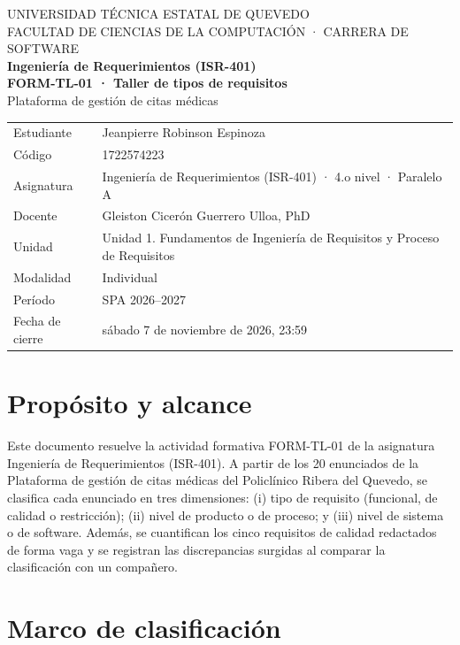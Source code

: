 \documentclass[11pt,a4paper]{article}
\newcommand{\codigoestudiante}{1722574223}
\newcommand{\nombreestudiante}{Jeanpierre Robinson Espinoza}
\begin{document}
\begin{center}
{\small UNIVERSIDAD TÉCNICA ESTATAL DE QUEVEDO}\\
{\small FACULTAD DE CIENCIAS DE LA COMPUTACIÓN · CARRERA DE SOFTWARE}\\[0.25cm]
{\large\bfseries Ingeniería de Requerimientos (ISR-401)}\\[0.15cm]
{\Large\bfseries FORM-TL-01 · Taller de tipos de requisitos}\\[0.1cm]
{\normalsize Plataforma de gestión de citas médicas}\\[0.35cm]
\end{center}

\begin{center}
\small
\begin{tabular}{@{}ll@{}}
\toprule
Estudiante & \nombreestudiante \\
Código & \codigoestudiante \\
Asignatura & Ingeniería de Requerimientos (ISR-401) · 4.o nivel · Paralelo A \\
Docente & Gleiston Cicerón Guerrero Ulloa, PhD \\
Unidad & Unidad 1. Fundamentos de Ingeniería de Requisitos y Proceso de Requisitos \\
Modalidad & Individual \\
Período & SPA 2026--2027 \\
Fecha de cierre & sábado 7 de noviembre de 2026, 23:59 \\
\bottomrule
\end{tabular}
\end{center}

\section{Propósito y alcance}

Este documento resuelve la actividad formativa FORM-TL-01 de la asignatura Ingeniería de Requerimientos (ISR-401). A partir de los 20 enunciados de la Plataforma de gestión de citas médicas del Policlínico Ribera del Quevedo, se clasifica cada enunciado en tres dimensiones: (i) tipo de requisito (funcional, de calidad o restricción); (ii) nivel de producto o de proceso; y (iii) nivel de sistema o de software. Además, se cuantifican los cinco requisitos de calidad redactados de forma vaga y se registran las discrepancias surgidas al comparar la clasificación con un compañero.

\section{Marco de clasificación}
\end{document}
